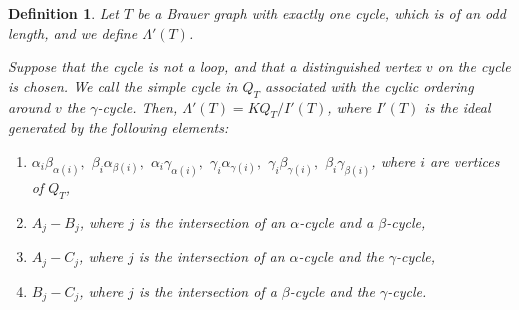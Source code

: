 \documentclass[12pt]{amsart}
\newtheorem{definition}[thm]{Definition}
\numberwithin{equation}{thm}
\newcounter{ni}
\begin{document}
\begin{definition}\label{D defn I}
Let $T$ be a Brauer graph with exactly one cycle, which is of an odd length, and we define $\Lambda'(T)$. 

Suppose that the cycle is not a loop, and that a distinguished vertex $v$ on the cycle is chosen. 
We call the simple cycle in $Q_T$ associated with the cyclic ordering around $v$ the $\gamma$-cycle. 
Then, $\Lambda'(T) = KQ_T/I'(T)$, where $I'(T)$ is the ideal generated by the following elements:
\begin{enumerate}
\item $\alpha_i\beta_{\alpha(i)},$ $\beta_i\alpha_{\beta(i)},$ $\alpha_i\gamma_{\alpha(i)},$ $\gamma_i\alpha_{\gamma(i)},$  
$\gamma_i\beta_{\gamma(i)},$ $\beta_i\gamma_{\beta(i)}$, where $i$ are vertices of $Q_T$,
\item $A_j-B_j$, where $j$ is the intersection of an $\alpha$-cycle and a $\beta$-cycle,
\item $A_j-C_j$, where $j$ is the intersection of an $\alpha$-cycle and the $\gamma$-cycle,
\item $B_j-C_j$, where $j$ is the intersection of a $\beta$-cycle and the $\gamma$-cycle.
\end{enumerate} 


\end{definition}
\end{document}
